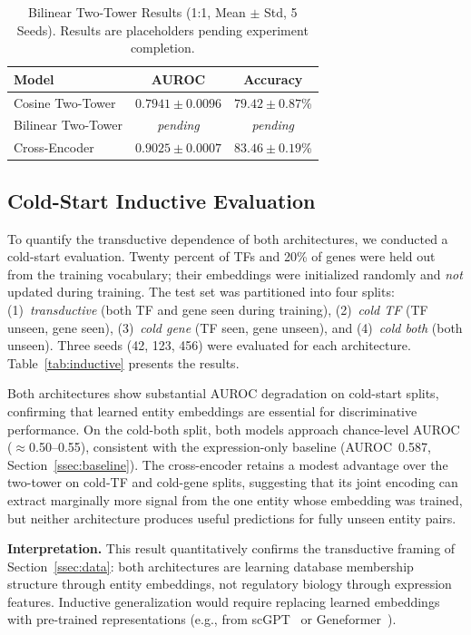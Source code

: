 \documentclass[journal]{IEEEtran}
\begin{document}
\begin{table}[!t]
  \caption{Bilinear Two-Tower Results (1:1, Mean $\pm$ Std, 5 Seeds).
    Results are placeholders pending experiment completion.}
  \label{tab:bilinear}
  \centering
  \footnotesize
  \begin{tabular}{@{}lcc@{}}
    \hline
    Model & AUROC & Accuracy \\
    \hline
    Cosine Two-Tower   & $0.7941 \pm 0.0096$ & $79.42 \pm 0.87$\% \\
    Bilinear Two-Tower & \textit{pending} & \textit{pending} \\
    Cross-Encoder      & $0.9025 \pm 0.0007$ & $83.46 \pm 0.19$\% \\
    \hline
  \end{tabular}
\end{table}

\subsection{Cold-Start Inductive Evaluation}
\label{ssec:inductive}

To quantify the transductive dependence of both architectures, we conducted
a cold-start evaluation. Twenty percent of TFs and 20\% of genes were held out
from the training vocabulary; their embeddings were initialized randomly and
\emph{not} updated during training. The test set was partitioned into four
splits: (1)~\emph{transductive} (both TF and gene seen during training),
(2)~\emph{cold TF} (TF unseen, gene seen), (3)~\emph{cold gene}
(TF seen, gene unseen), and (4)~\emph{cold both} (both unseen).
Three seeds (42, 123, 456) were evaluated for each architecture.
Table~\ref{tab:inductive} presents the results.

Both architectures show substantial AUROC degradation on cold-start splits,
confirming that learned entity embeddings are essential for discriminative
performance. On the cold-both split, both models approach chance-level
AUROC ($\approx$0.50--0.55), consistent with the expression-only baseline
(AUROC~0.587, Section~\ref{ssec:baseline}). The cross-encoder retains a
modest advantage over the two-tower on cold-TF and cold-gene splits,
suggesting that its joint encoding can extract marginally more signal from
the one entity whose embedding was trained, but neither architecture
produces useful predictions for fully unseen entity pairs.

\textbf{Interpretation.} This result quantitatively confirms the transductive
framing of Section~\ref{ssec:data}: both architectures are learning database
membership structure through entity embeddings, not regulatory biology through
expression features. Inductive generalization would require replacing learned
embeddings with pre-trained representations (e.g., from scGPT~\cite{cui2024}
or Geneformer~\cite{theodoris2023}).
\end{document}
